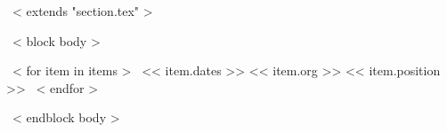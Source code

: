~< extends "section.tex" >~

~< block body >~
\begin{entrylistThree}
~< for item in items >~
\entryThree
{<< item.dates >>}
{<< item.org >>}
{<< item.position >>}
~< endfor >~
\end{entrylistThree}
~< endblock body >~
